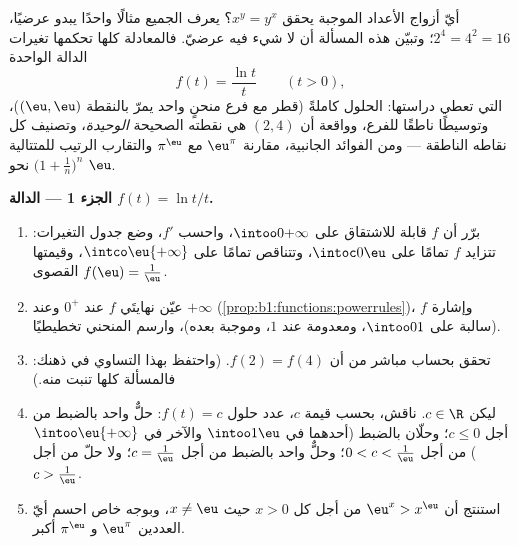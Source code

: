 \begin{problem}\label{pb:b1:functions:1}
أيّ أزواج الأعداد الموجبة يحقق $x^y = y^x$؟ يعرف الجميع
مثالًا واحدًا يبدو عرضيًا، $2^4 = 4^2 = 16$؛ وتبيّن هذه المسألة
أن لا شيء فيه عرضيّ. فالمعادلة كلها تحكمها
تغيرات الدالة الواحدة
\[
f(t) = \frac{\ln t}{t} \qquad (t > 0),
\]
التي تعطي دراستها:  الحلول كاملةً (قطر مع فرع منحنٍ واحد يمرّ بالنقطة $(\eu, \eu)$)، وتوسيطًا ناطقًا للفرع،
وواقعة أن $(2, 4)$ هي نقطته الصحيحة \emph{الوحيدة}،
وتصنيف كل نقاطه الناطقة --- ومن الفوائد الجانبية،
مقارنة $\eu^\pi$ مع $\pi^\eu$ والتقارب الرتيب للمتتالية
$\bigl(1 + \frac1n\bigr)^n$ نحو $\eu$.

\medskip
\noindent\textbf{الجزء 1 --- الدالة $f(t) = \ln t / t$.}
\begin{enumerate}
  \item برّر أن $f$ قابلة للاشتقاق على $\intoo0{+\infty}$،
        واحسب $f'$، وضع جدول التغيرات: تتزايد $f$
        تمامًا على $\intoc0\eu$، وتتناقص تمامًا على
        $\intco\eu{+\infty}$، وقيمتها القصوى $f(\eu) = \frac1\eu$.
  \item عيّن نهايتَي $f$ عند $0^+$ وعند $+\infty$
        (\cref{prop:b1:functions:powerrules})، وإشارة $f$
        (سالبة على $\intoo01$، ومعدومة عند $1$، وموجبة بعده)،
        وارسم المنحني تخطيطيًا.
  \item تحقق بحساب مباشر من أن $f(2) = f(4)$. (واحتفظ بهذا
        التساوي في ذهنك: فالمسألة كلها تنبت منه.)
  \item ليكن $c \in \R$. ناقش، بحسب قيمة $c$، عدد
        حلول $f(t) = c$: حلٌّ واحد بالضبط من أجل $c \leq
        0$؛ وحلّان بالضبط (أحدهما في $\intoo1\eu$ والآخر في
        $\intoo\eu{+\infty}$) من أجل $0 < c < \frac1\eu$؛ وحلٌّ واحد
        بالضبط من أجل $c = \frac1\eu$؛ ولا حلّ من أجل $c > \frac1\eu$.
  \item استنتج أن $\eu^x > x^\eu$ من أجل كل $x > 0$ حيث $x \neq
        \eu$، وبوجه خاص احسم أيّ العددين $\eu^\pi$ و
        $\pi^\eu$ أكبر.
\end{enumerate}


\end{problem}
